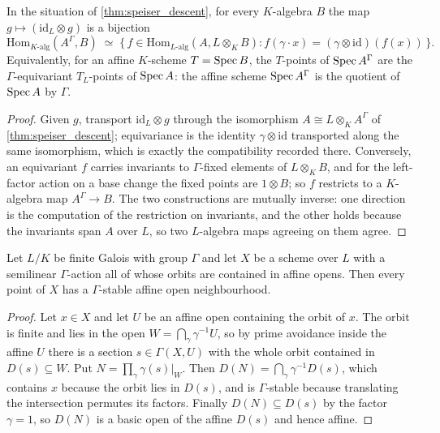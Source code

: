 \begin{theorem}\leanok
  \label{thm:galois_quotient_points}
  In the situation of \cref{thm:speiser_descent}, for every \(K\)-algebra \(B\)
  the map \(g \mapsto (\mathrm{id}_L \otimes g)\) is a bijection
  \[
    \mathrm{Hom}_{K\text{-alg}}(A^\Gamma, B)
      \;\simeq\;
    \{\, f \in \mathrm{Hom}_{L\text{-alg}}(A, L \otimes_K B) :
       f(\gamma \cdot x) = (\gamma \otimes \mathrm{id})(f(x)) \,\}.
  \]
  Equivalently, for an affine \(K\)-scheme \(T = \operatorname{Spec} B\), the \(T\)-points of
  \(\operatorname{Spec} A^\Gamma\) are the \(\Gamma\)-equivariant \(T_L\)-points of
  \(\operatorname{Spec} A\): the affine scheme \(\operatorname{Spec} A^\Gamma\) is the quotient of
  \(\operatorname{Spec} A\) by \(\Gamma\).
\end{theorem}

\begin{proof}\leanok
  Given \(g\), transport \(\mathrm{id}_L \otimes g\) through the isomorphism
  \(A \cong L \otimes_K A^\Gamma\) of \cref{thm:speiser_descent}; equivariance is
  the identity \(\gamma \otimes \mathrm{id}\) transported along the same
  isomorphism, which is exactly the compatibility recorded there. Conversely, an
  equivariant \(f\) carries invariants to \(\Gamma\)-fixed elements of
  \(L \otimes_K B\), and for the left-factor action on a base change the fixed
  points are \(1 \otimes B\); so \(f\) restricts to a \(K\)-algebra map
  \(A^\Gamma \to B\). The two constructions are mutually inverse: one direction
  is the computation of the restriction on invariants, and the other holds
  because the invariants span \(A\) over \(L\), so two \(L\)-algebra maps
  agreeing on them agree.
\end{proof}

\begin{lemma}\leanok
  \label{lem:stable_affine_open}
  Let \(L/K\) be finite Galois with group \(\Gamma\) and let \(X\) be a scheme
  over \(L\) with a semilinear \(\Gamma\)-action all of whose orbits are
  contained in affine opens. Then every point of \(X\) has a \(\Gamma\)-stable
  affine open neighbourhood.
\end{lemma}

\begin{proof}\leanok
  Let \(x \in X\) and let \(U\) be an affine open containing the orbit of \(x\).
  The orbit is finite and lies in the open
  \(W = \bigcap_{\gamma} \gamma^{-1} U\), so by prime avoidance inside the affine
  \(U\) there is a section \(s \in \Gamma(X, U)\) with the whole orbit contained
  in \(D(s) \subseteq W\). Put \(N = \prod_{\gamma} \gamma(s)|_W\). Then
  \(D(N) = \bigcap_{\gamma} \gamma^{-1} D(s)\), which contains \(x\) because the
  orbit lies in \(D(s)\), and is \(\Gamma\)-stable because translating the
  intersection permutes its factors. Finally \(D(N) \subseteq D(s)\) by the
  factor \(\gamma = 1\), so \(D(N)\) is a basic open of the affine \(D(s)\) and
  hence affine.
\end{proof}


